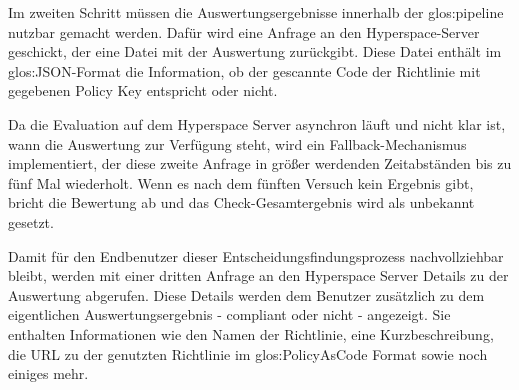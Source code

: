 \documentclass[../main.tex]{subfiles}
\begin{document}
Im zweiten Schritt müssen die Auswertungsergebnisse innerhalb der \gls{glos:pipeline} nutzbar gemacht werden.
Dafür wird eine Anfrage an den Hyperspace-Server geschickt, der eine Datei mit der Auswertung zurückgibt.
Diese Datei enthält im \gls{glos:JSON}-Format die Information, ob der gescannte Code der Richtlinie mit gegebenen Policy Key entspricht oder nicht.

Da die Evaluation auf dem Hyperspace Server asynchron läuft und nicht klar ist, wann die Auswertung zur Verfügung steht, wird ein Fallback-Mechanismus implementiert, der diese zweite Anfrage in größer werdenden Zeitabständen bis zu fünf Mal wiederholt.
Wenn es nach dem fünften Versuch kein Ergebnis gibt, bricht die Bewertung ab und das Check-Gesamtergebnis wird als unbekannt gesetzt.

Damit für den Endbenutzer dieser Entscheidungsfindungsprozess nachvollziehbar bleibt, werden mit einer dritten Anfrage an den Hyperspace Server Details zu der Auswertung abgerufen.
Diese Details werden dem Benutzer zusätzlich zu dem eigentlichen Auswertungsergebnis - compliant oder nicht - angezeigt.
Sie enthalten Informationen wie den Namen der Richtlinie, eine Kurzbeschreibung, die URL zu der genutzten Richtlinie im \gls{glos:PolicyAsCode} Format sowie noch einiges mehr.
\end{document}
